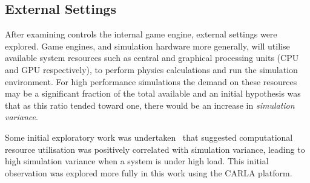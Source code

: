 \documentclass[runningheads,twocolumn,a4paper,10pt]{llncs}
\begin{document}


\subsection{External Settings}

After examining controls the internal game engine, external settings were explored. 
%
Game engines, and simulation hardware more generally, will utilise available system resources such as central and graphical processing units (CPU and GPU respectively), to perform physics calculations and run the simulation environment. 
%
For high performance simulations the demand on these resources may be a significant fraction of the total available and an initial hypothesis was that as this ratio tended toward one, there would be an increase in \textit{simulation variance}.

Some initial exploratory work was undertaken~\cite{TSLUnrealEngineTesting} that suggested computational resource utilisation was positively correlated with simulation variance, leading to high simulation variance when a system is under high load. This initial observation was explored more fully in this work using the CARLA platform. 

\end{document}

